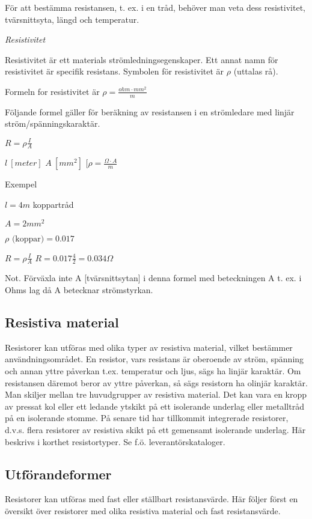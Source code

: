 För att bestämma resistansen, t. ex. i en tråd,
behöver man veta dess resistivitet, tvärsnittsyta, längd och temperatur.

\emph{Resistivitet}

Resistivitet är ett materials strömledningsegenskaper. Ett annat namn för resistivitet
är specifik resistans. Symbolen för resistivitet är \(\rho\) (uttalas rå).

Formeln for resistivitet är \(\rho = \frac{ohm \cdot mm^2}{m}\)

Följande formel gäller för beräkning av resistansen i en strömledare med
linjär ström/spänningskaraktär.

\(R = \rho \frac{I}{A} \)

\(l\ [meter]\) \(A\ [mm^2]\) \([\rho = \frac{\Omega \cdot A}{m} \)

Exempel

\(l = 4 m\) koppartråd

\(A = 2 mm^2\)

\(\rho \text{ (koppar)} = 0.017\)

\(R = \rho \frac{I}{A}\) \(R = 0.017 \frac{4}{2} = 0.034 \Omega\)

Not. Förväxla inte A [tvärsnittsytan] i denna
formel med beteckningen A t. ex. i Ohms lag då A
betecknar strömstyrkan.

\subsection{Resistiva material}

Resistorer kan utföras med olika typer av
resistiva material, vilket bestämmer användningsområdet.
En resistor, vars resistans är oberoende
av ström, spänning och annan yttre påverkan t.ex. temperatur och ljus, sägs ha linjär
karaktär. Om resistansen däremot beror av
yttre påverkan, så sägs resistorn ha olinjär
karaktär.
Man skiljer mellan tre huvudgrupper av
resistiva material. Det kan vara en kropp av
pressat kol eller ett ledande ytskikt på ett
isolerande underlag eller metalltråd på en
isolerande stomme. På senare tid har tillkommit integrerade resistorer, d.v.s. flera
resistorer av resistiva skikt på ett gemensamt isolerande underlag. Här beskrivs i
korthet
resistortyper. Se f.ö. leverantörskataloger.

\subsection{Utförandeformer}

Resistorer kan utföras med fast eller ställbart resistansvärde. Här följer först en översikt över resistorer med olika resistiva material och fast resistansvärde.

